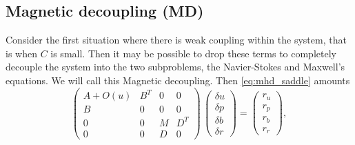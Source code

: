 \subsection{Magnetic decoupling (MD)}
\label{sec:FEMmd}

Consider the first situation where there is  weak coupling within the system, that is when $C$ is small. Then it may be possible to drop these terms to completely decouple the system into the two subproblems, the Navier-Stokes and Maxwell's equations. We will call this Magnetic decoupling.
Then \eqref{eq:mhd_saddle} amounts
\begin{equation}
\label{eq:matrix_MD}
\left(
\begin{array}{cccc}
A+O(u) & B^T & 0 & 0\\
B & 0 & 0 & 0 \\
0 & 0 & M & D^T\\
0 & 0 & D & 0
\end{array}
\right)
\,
\left(
\begin{array}{c}
\delta u\\
\delta p\\
\delta b\\
\delta r
\end{array}
\right)  =
\begin{pmatrix}
r_u \\
r_p\\
r_b\\
r_r
\end{pmatrix},
\end{equation}
